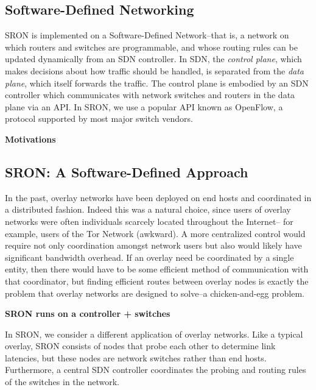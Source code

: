 \documentclass[pageno]{jpaper}
\begin{document}
\subsection{Software-Defined Networking}
SRON is implemented on a Software-Defined Network--that is, a network on which routers and switches are programmable, and whose routing rules can be updated dynamically from an SDN controller.  In SDN, the {\it control plane}, which makes decisions about how traffic should be handled, is separated from the {\it data plane}, which itself forwards the traffic\cite{Feamster:2014:RSI:2602204.2602219}.  The control plane is embodied by an SDN controller which communicates with network switches and routers in the data plane via an API.  In SRON, we use a popular API known as OpenFlow\cite{McKeown:2008:OEI:1355734.1355746}, a protocol supported by most major switch vendors.  


{\bf Motivations}\bigskip


\subsection{SRON: A Software-Defined Approach}


In the past, overlay networks have been deployed on end hosts and coordinated 
in a distributed fashion.  Indeed this was a natural choice, since users of 
overlay networks were often individuals scarcely located throughout the Internet--
for example, users of the Tor Network (awkward).  A more centralized control
would require not only coordination amongst network users but also would likely have 
significant bandwidth overhead.  If an overlay need be coordinated by a single entity,
then there would have to be some efficient method of communication with that coordinator, but 
finding efficient routes between overlay nodes is exactly the problem that overlay networks are designed to solve--a chicken-and-egg problem.  

{\bf SRON runs on a controller + switches}\bigskip

In SRON, we consider a different application of overlay networks. Like a typical overlay,
SRON consists of nodes that probe each other to determine link latencies, but these nodes
are network switches rather than end hosts. Furthermore, a central SDN controller coordinates 
the probing and routing rules of the switches in the network. 
\end{document}
